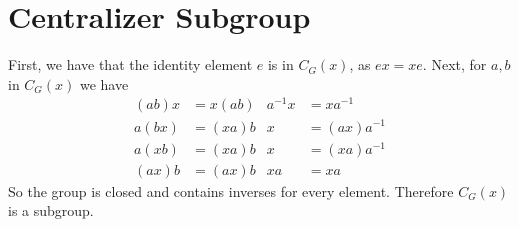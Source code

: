 \documentclass[12pt]{article}
\newcommand*{\inv}{^{-1}}
\begin{document}
\section{Centralizer Subgroup}
First, we have that the identity element $e$ is in $C_G(x)$, as $ex = xe$. Next, for $a,b$ in $C_G(x)$ we have
\begin{align*}
(ab)x &= x(ab) & a\inv x &= x a\inv\\
a(bx) &= (xa)b & x &= (a x) a\inv\\
a(xb) &= (xa)b & x &= (x a) a\inv\\
(ax)b &= (ax)b & x a &= x a
\end{align*}
So the group is closed and contains inverses for every element. Therefore $C_G(x)$ is a subgroup.
\end{document}

